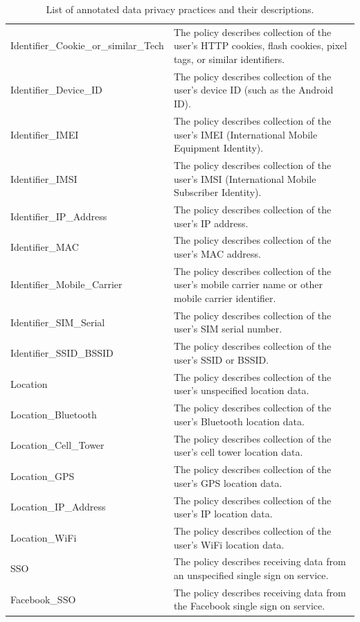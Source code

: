 \begin{table}[]
{\begin{tabular}{ll}
	Identifier\_Cookie\_or\_similar\_Tech & The policy describes collection of the user's HTTP cookies, flash cookies, pixel tags, or similar identifiers. \\
	Identifier\_Device\_ID    & The policy describes collection of the user's device ID (such as the Android ID).              \\
	Identifier\_IMEI          & The policy describes collection of the user's IMEI (International Mobile Equipment Identity).  \\
	Identifier\_IMSI          & The policy describes collection of the user's IMSI (International Mobile Subscriber Identity). \\
	Identifier\_IP\_Address   & The policy describes collection of the user's IP address.                                      \\
	Identifier\_MAC           & The policy describes collection of the user's MAC address.                                     \\
	Identifier\_Mobile\_Carrier           & The policy describes collection of the user's mobile carrier name or other mobile carrier identifier.          \\
	Identifier\_SIM\_Serial   & The policy describes collection of the user's SIM serial number.                               \\
	Identifier\_SSID\_BSSID   & The policy describes collection of the user's SSID or BSSID.                                   \\
	Location                  & The policy describes collection of the user's unspecified location data.                       \\
	Location\_Bluetooth       & The policy describes collection of the user's Bluetooth location data.                         \\
	Location\_Cell\_Tower     & The policy describes collection of the user's cell tower location data.                        \\
	Location\_GPS             & The policy describes collection of the user's GPS location data.                               \\
	Location\_IP\_Address     & The policy describes collection of the user's IP location data.                                \\
	Location\_WiFi            & The policy describes collection of the user's WiFi location data.                              \\
	SSO                       & The policy describes receiving data from an unspecified single sign on service.                \\
	Facebook\_SSO             & The policy describes receiving data from the Facebook single sign on service.                 
	\end{tabular}%
	}
	\caption{List of annotated data privacy practices and their descriptions.}
	\end{table}


